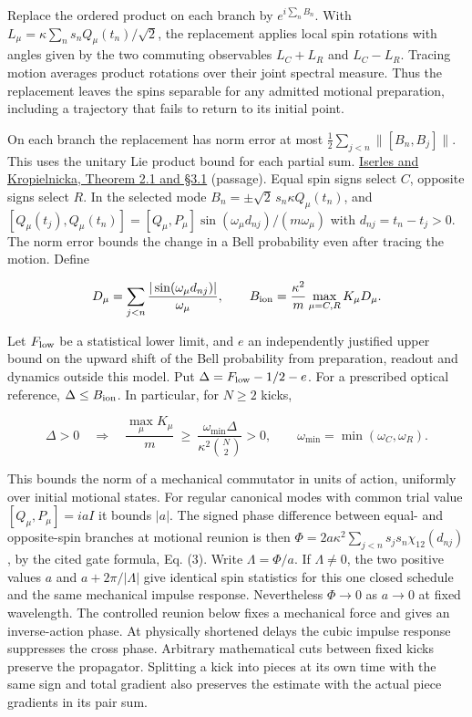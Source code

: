 \documentclass[11pt,a4paper]{article}
\begin{document}
Replace the ordered product on each branch by \(e^{i\sum_n B_n}\). With
\(L_\mu=\kappa\sum_n s_n Q_\mu(t_n)/\sqrt2\), the replacement applies
local spin rotations with angles given by the two commuting observables
\(L_C+L_R\) and \(L_C-L_R\). Tracing motion averages product rotations
over their joint spectral measure. Thus the replacement leaves the spins
separable for any admitted motional preparation, including a trajectory
that fails to return to its initial point.

On each branch the replacement has norm error at most
\(\tfrac12\sum_{j<n}\|[B_n,B_j]\|\). This uses the unitary Lie product
bound for each partial sum.
\href{https://arxiv.org/pdf/2401.06635\#page=5}{Iserles and
Kropielnicka, Theorem 2.1 and §3.1} (passage). Equal spin signs select
\(C\), opposite signs select \(R\). In the selected mode
\(B_n=\pm\sqrt2\,s_n\kappa Q_\mu(t_n)\), and
\([Q_\mu(t_j),Q_\mu(t_n)]=[Q_\mu,P_\mu]\sin(\omega_\mu d_{nj})/(m\omega_\mu)\)
with \(d_{nj}=t_n-t_j>0\). The norm error bounds the change in a Bell
probability even after tracing the motion. Define

\[
D_\mu=\sum_{j<n}\frac{|\sin(\omega_\mu d_{nj})|}{\omega_\mu},
\qquad
B_{\rm ion}=\frac{\kappa^2}{m}\max_{\mu=C,R} K_\mu D_\mu .
\]

Let \(F_{\rm low}\) be a statistical lower limit, and \(e\) an
independently justified upper bound on the upward shift of the Bell
probability from preparation, readout and dynamics outside this model.
Put \(\Delta=F_{\rm low}-1/2-e\). For a prescribed optical reference,
\(\Delta\le B_{\rm ion}\). In particular, for \(N\ge2\) kicks,

\[
\boxed{\quad \Delta>0\quad\Longrightarrow\quad
\frac{\max_\mu K_\mu}{m}\ \ge\
\frac{\omega_{\min}\Delta}{\kappa^2\binom{N}{2}}>0,\qquad
\omega_{\min}=\min(\omega_C,\omega_R).\quad}
\]

This bounds the norm of a mechanical commutator in units of action,
uniformly over initial motional states. For regular canonical modes with
common trial value \([Q_\mu,P_\mu]=iaI\) it bounds \(|a|\). The signed
phase difference between equal- and opposite-spin branches at motional
reunion is then \(\Phi=2a\kappa^2\sum_{j<n}s_js_n\chi_{12}(d_{nj})\), by
the cited gate formula, Eq. (3). Write \(\Lambda=\Phi/a\). If
\(\Lambda\ne0\), the two positive values \(a\) and \(a+2\pi/|\Lambda|\)
give identical spin statistics for this one closed schedule and the same
mechanical impulse response. Nevertheless \(\Phi\to0\) as \(a\to0\) at
fixed wavelength. The controlled reunion below fixes a mechanical force
and gives an inverse-action phase. At physically shortened delays the
cubic impulse response suppresses the cross phase. Arbitrary
mathematical cuts between fixed kicks preserve the propagator. Splitting
a kick into pieces at its own time with the same sign and total gradient
also preserves the estimate with the actual piece gradients in its pair
sum.
\end{document}
